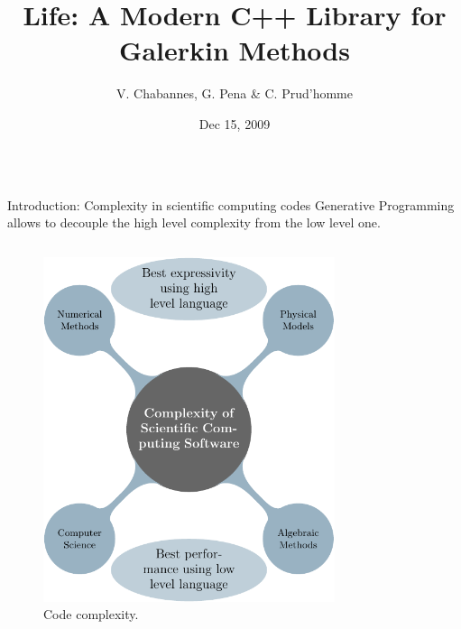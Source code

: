 \documentclass[final,utf8,,hyperref={pdfpagelabels=false}]{beamer}
\title[Life]{Life: A Modern C++ Library for Galerkin Methods}
\author[V. Chabannes, G. Pena \& C. Prud'homme]{V. Chabannes, G. Pena \& C. Prud'homme}
\institute[U. Coimbra \& U. Grenoble]{U. Coimbra and U. de Grenoble}
\date{Dec 15, 2009}
\begin{document}
  \begin{frame}[containsverbatim]{} 
    \vfill
    \begin{columns}[t]
    \begin{block}{Introduction: Complexity in scientific computing codes}
      Generative Programming allows to decouple the high level complexity from
      the low level one.
      \begin{columns}[t]
        \begin{figure}[c]
          \includegraphics[width=.9\linewidth]{genprog1-crop}
          \caption{Code complexity.}
          \label{fig:10}
      \end{figure}
        \begin{figure}[c]

\end{figure}
\end{columns}
\end{block}
\end{columns}
\end{frame}
\end{document}
